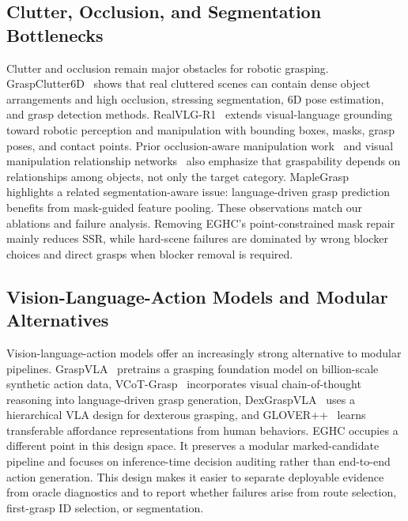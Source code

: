 \subsection{Clutter, Occlusion, and Segmentation Bottlenecks}

Clutter and occlusion remain major obstacles for robotic grasping. GraspClutter6D~\cite{graspclutter6d} shows that real cluttered scenes can contain dense object arrangements and high occlusion, stressing segmentation, 6D pose estimation, and grasp detection methods. RealVLG-R1~\cite{realvlgr1} extends visual-language grounding toward robotic perception and manipulation with bounding boxes, masks, grasp poses, and contact points. Prior occlusion-aware manipulation work~\cite{occlusion} and visual manipulation relationship networks~\cite{relationship} also emphasize that graspability depends on relationships among objects, not only the target category. MapleGrasp~\cite{maplegrasp} highlights a related segmentation-aware issue: language-driven grasp prediction benefits from mask-guided feature pooling. These observations match our ablations and failure analysis. Removing EGHC's point-constrained mask repair mainly reduces SSR, while hard-scene failures are dominated by wrong blocker choices and direct grasps when blocker removal is required.

\subsection{Vision-Language-Action Models and Modular Alternatives}

Vision-language-action models offer an increasingly strong alternative to modular pipelines. GraspVLA~\cite{graspvla} pretrains a grasping foundation model on billion-scale synthetic action data, VCoT-Grasp~\cite{vcotgrasp} incorporates visual chain-of-thought reasoning into language-driven grasp generation, DexGraspVLA~\cite{dexgraspvla} uses a hierarchical VLA design for dexterous grasping, and GLOVER++~\cite{gloverpp} learns transferable affordance representations from human behaviors. EGHC occupies a different point in this design space. It preserves a modular marked-candidate pipeline and focuses on inference-time decision auditing rather than end-to-end action generation. This design makes it easier to separate deployable evidence from oracle diagnostics and to report whether failures arise from route selection, first-grasp ID selection, or segmentation.
